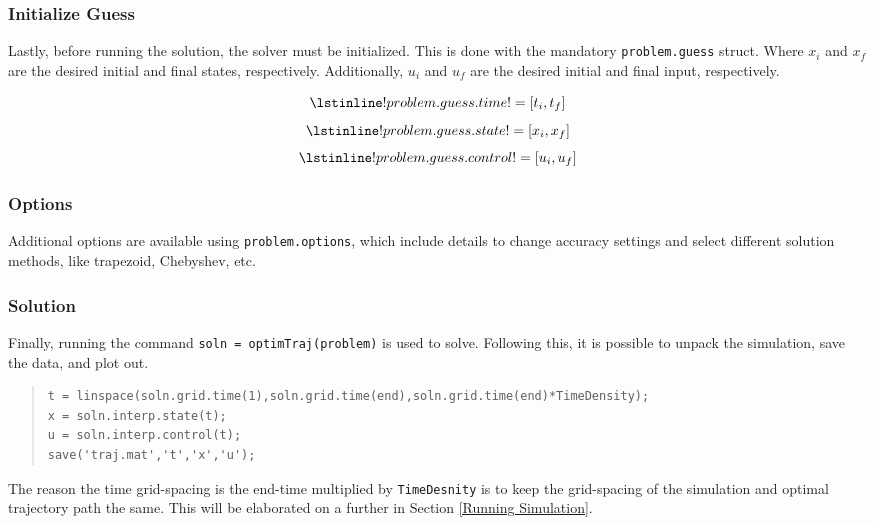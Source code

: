\documentclass[12pt]{article}
\begin{document}
\subsubsection{Initialize Guess}
Lastly, before running the solution, the solver must be initialized. This is done with the mandatory \lstinline!problem.guess! struct. Where $x_{i}$ and $x_{f}$ are the desired initial and final states, respectively. Additionally, $u_{i}$ and $u_{f}$ are the desired initial and final input, respectively. 

\begin{figure}[H]
\begin{equation*}
\lstinline!problem.guess.time! = [t_{i}, t_{f}]
\end{equation*}
\begin{equation*}
\lstinline!problem.guess.state! = [x_{i}, x_{f}]
\end{equation*}
\begin{equation*}
\lstinline!problem.guess.control! = [u_{i}, u_{f}] 
\end{equation*}
\end{figure}
\subsubsection{Options}
Additional options are available using \lstinline!problem.options!, which include details to change accuracy settings and select different solution methods, like trapezoid, Chebyshev, etc.
\subsubsection{Solution}
Finally, running the command \lstinline!soln = optimTraj(problem)! is used to solve. Following this, it is possible to unpack the simulation, save the data, and plot out.
\begin{quote}
\begin{lstlisting}
t = linspace(soln.grid.time(1),soln.grid.time(end),soln.grid.time(end)*TimeDensity);
x = soln.interp.state(t);
u = soln.interp.control(t);
save('traj.mat','t','x','u');
\end{lstlisting}
\end{quote}

The reason the time grid-spacing is the end-time multiplied by \lstinline!TimeDesnity! is to keep the grid-spacing of the simulation and optimal trajectory path the same. This will be elaborated on a further in Section \ref{Running Simulation}.

\end{document}
